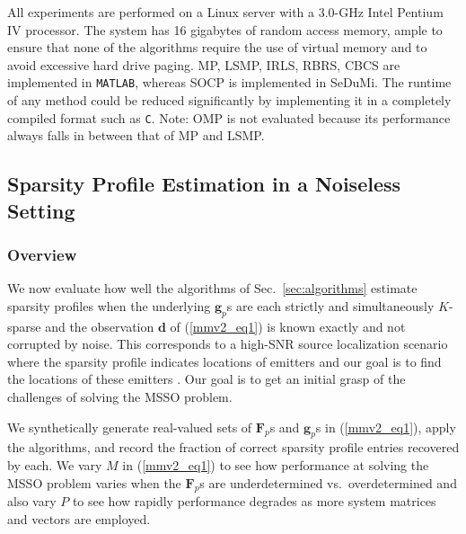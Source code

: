\documentclass[final]{siamltex}
\newcommand{\la}[1]{\mbox{$\mathbf{#1}$}}  \newcommand{\sst}[1]{\mbox{\scriptsize{#1}}}
\begin{document}
   All experiments are performed on a Linux server with a 3.0-GHz
   Intel Pentium IV processor.  The system has 16 gigabytes of random
   access memory, ample to ensure that none of the algorithms require
   the use of virtual memory and to avoid excessive hard drive paging.
   MP, LSMP, IRLS, RBRS, CBCS are implemented in {\tt{MATLAB}},
   whereas SOCP is implemented in SeDuMi.  The runtime of any method
   could be reduced significantly by implementing it in a completely
   compiled format such as {\tt{C}}.  Note: OMP is not evaluated
   because its performance always falls in between that of MP and
   LSMP\@.

\subsection{Sparsity Profile Estimation in a Noiseless Setting}
\label{subsec:e1}

   \subsubsection{Overview} We now evaluate how well the algorithms of
   Sec.~\ref{sec:algorithms} estimate sparsity profiles when the
   underlying $\la{g}_p$s are each strictly and simultaneously
   $K$-sparse and the observation $\la{d}$ of (\ref{mmv2_eq1}) is
   known exactly and not corrupted by noise.  This corresponds to a
   high-SNR source localization scenario where the sparsity profile
   indicates locations of emitters and our goal is to find the
   locations of these emitters \cite{Joh1993, Kri1996, Mal2003,
   Mal2005}.  Our goal is to get an initial grasp of the challenges of
   solving the MSSO problem.

   We synthetically generate real-valued sets of $\la{F}_p$s and
   $\la{g}_p$s in (\ref{mmv2_eq1}), apply the algorithms, and record
   the fraction of correct sparsity profile entries recovered by each.
   We vary $M$ in (\ref{mmv2_eq1}) to see how performance at solving
   the MSSO problem varies when the $\la{F}_p$s are underdetermined
   vs.~overdetermined and also vary $P$ to see how rapidly performance
   degrades as more system matrices and vectors are employed.
\end{document}
